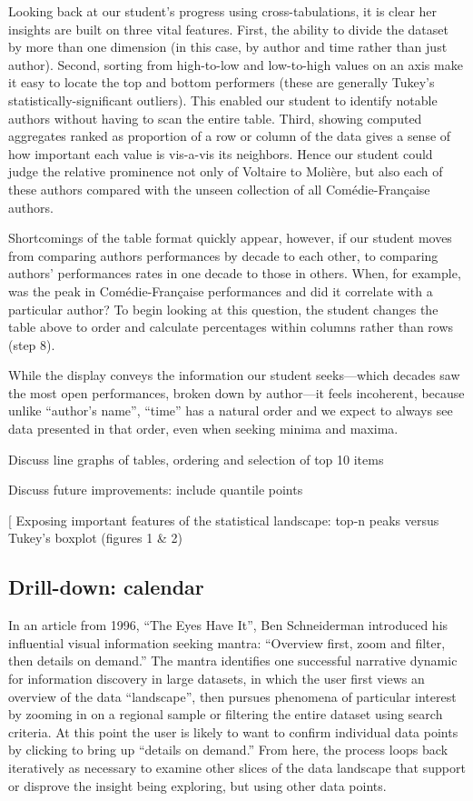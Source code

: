 \documentclass[	DIV=calc,%
							paper=a4,%
							fontsize=11pt,%
							twocolumn]{scrartcl}	 					%
\begin{document}
Looking back at our student’s progress using cross-tabulations, it is clear her insights are built on three vital features.  First, the ability to divide the dataset by more than one dimension (in this case, by author and time rather than just author).  Second, sorting from high-to-low and low-to-high values on an axis make it easy to locate the top and bottom performers (these are generally Tukey’s statistically-significant outliers).  This enabled our student to identify notable authors without having to scan the entire table. Third, showing computed aggregates ranked as proportion of a row or column of the data gives a sense of how important each value is vis-a-vis its neighbors.  Hence our student could judge the relative prominence not only of Voltaire to Molière, but also each of these authors compared with the unseen collection of all Comédie-Française authors.

Shortcomings of the table format quickly appear, however, if our student moves from comparing authors performances by decade to each other, to comparing authors’ performances rates in one decade to those in others.  When, for example, was the peak in Comédie-Française performances and did it correlate with a particular author?  To begin looking at this question, the student changes the table above to order and calculate percentages within columns rather than rows (step 8).

While the display conveys the information our student seeks—which decades saw the most open performances, broken down by author—it feels incoherent, because unlike ``author’s name'', ``time'' has a natural order and we expect to always see data presented in that order, even when seeking minima and maxima.

Discuss line graphs of tables, ordering and selection of top 10 items

Discuss future improvements:  include quantile points

[ Exposing important features of the statistical landscape: top-n peaks versus Tukey’s boxplot (figures 1 \& 2)

\subsection*{Drill-down: calendar}

In an article from 1996, ``The Eyes Have It'', Ben Schneiderman introduced his influential visual information seeking mantra: ``Overview first, zoom and filter, then details on demand.''\cite{Shneiderman:1996}  The mantra identifies one successful narrative dynamic for information discovery in large datasets, in which the user first views an overview of the data ``landscape'', then pursues phenomena of particular interest by zooming in on a regional sample or filtering the entire dataset using search criteria.  At this point the user is likely to want to confirm individual data points by clicking to bring up ``details on demand.''  From here, the process loops back iteratively as necessary to examine other slices of the data landscape that support or disprove the insight being exploring, but using other data points.
\end{document}
